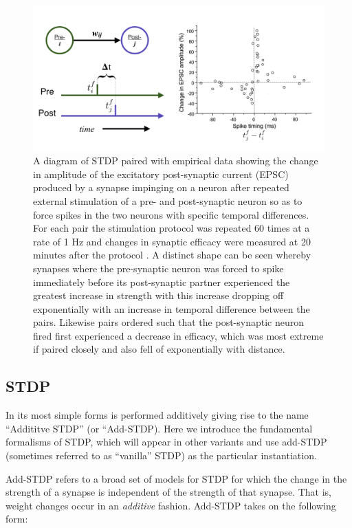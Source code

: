 \begin{figure} [h]
\centering
\includegraphics[width=\textwidth]{./images/STDP_intro_fig.png}
\caption[From Bi and Poo, 1998 \cite{bi1998synaptic}]{A diagram of STDP paired with empirical data showing the change in amplitude of the excitatory post-synaptic current (EPSC) produced by a synapse impinging on a neuron after repeated external stimulation of a pre- and post-synaptic neuron so as to force spikes in the two neurons with specific temporal differences. For each pair the stimulation protocol was repeated 60 times at a rate of 1 Hz and changes in synaptic efficacy were measured at 20 minutes after the protocol  \cite{bi1998synaptic}. A distinct shape can be seen whereby synapses where the pre-synaptic neuron was forced to spike immediately before its post-synaptic partner  experienced the greatest increase in strength with this increase dropping off exponentially with an increase in temporal difference between the pairs. Likewise pairs ordered such that the post-synaptic neuron fired first experienced a decrease in efficacy, which was most extreme if paired closely and also fell of exponentially with distance.}
\label{STDP_intro}
\end{figure}
\subsection{STDP}

In its most simple forms  is performed additively giving rise to the name ``Addititve STDP'' (or ``Add-STDP). Here we introduce the fundamental formalisms of STDP, which will appear in other variants and use add-STDP (sometimes referred to as ``vanilla'' STDP) as the particular instantiation.

Add-STDP refers to a broad set of models for STDP for which the change in the strength of a synapse is independent of the strength of that synapse. That is, weight changes occur in an \emph{additive} fashion. Add-STDP takes on the following form:

